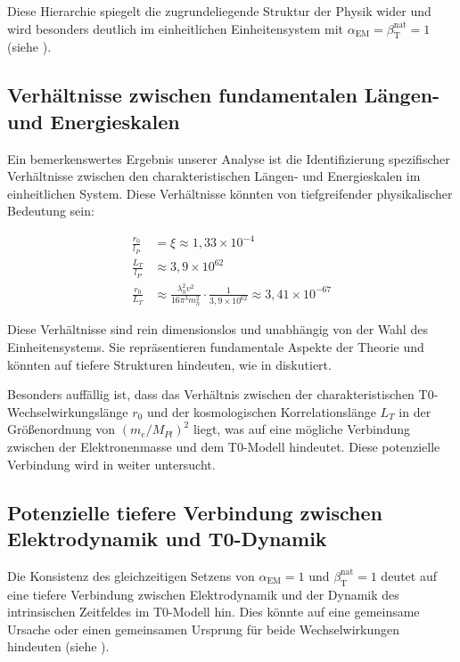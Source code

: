 \documentclass[12pt,a4paper]{article}
\newcommand{\alphaEM}{\alpha_{\text{EM}}}
\newcommand{\betaT}{\beta_{\text{T}}}
\begin{document}
	Diese Hierarchie spiegelt die zugrundeliegende Struktur der Physik wider und wird besonders deutlich im einheitlichen Einheitensystem mit \(\alphaEM = \betaT^{\text{nat}} = 1\) (siehe \cite{pascher_temp_2025}).
	
	\subsection{Verhältnisse zwischen fundamentalen Längen- und Energieskalen}
	\label{subsec:ratios}
	
	Ein bemerkenswertes Ergebnis unserer Analyse ist die Identifizierung spezifischer Verhältnisse zwischen den charakteristischen Längen- und Energieskalen im einheitlichen System. Diese Verhältnisse könnten von tiefgreifender physikalischer Bedeutung sein:
	
	\begin{tcolorbox}[colback=blue!5!white,colframe=blue!75!black,title=Fundamentale Verhältnisse im einheitlichen Einheitensystem]
		\begin{align}
			\frac{r_0}{l_P} &= \xi \approx 1,33 \times 10^{-4} \\
			\frac{L_T}{l_P} &\approx 3,9 \times 10^{62} \\
			\frac{r_0}{L_T} &\approx \frac{\lambda_h^2 v^2}{16\pi^3 m_h^2} \cdot \frac{1}{3,9 \times 10^{62}} \approx 3,41 \times 10^{-67}
		\end{align}
	\end{tcolorbox}
	
	Diese Verhältnisse sind rein dimensionslos und unabhängig von der Wahl des Einheitensystems. Sie repräsentieren fundamentale Aspekte der Theorie und könnten auf tiefere Strukturen hindeuten, wie in \cite{pascher_planck_2025} diskutiert.
	
	Besonders auffällig ist, dass das Verhältnis zwischen der charakteristischen T0-Wechselwirkungslänge \(r_0\) und der kosmologischen Korrelationslänge \(L_T\) in der Größenordnung von \((m_e/M_{Pl})^2\) liegt, was auf eine mögliche Verbindung zwischen der Elektronenmasse und dem T0-Modell hindeutet. Diese potenzielle Verbindung wird in \cite{pascher_galaxies_2025} weiter untersucht.
	
	\subsection{Potenzielle tiefere Verbindung zwischen Elektrodynamik und T0-Dynamik}
	\label{subsec:deeper_connection}
	
	Die Konsistenz des gleichzeitigen Setzens von \(\alphaEM = 1\) und \(\betaT^{\text{nat}} = 1\) deutet auf eine tiefere Verbindung zwischen Elektrodynamik und der Dynamik des intrinsischen Zeitfeldes im T0-Modell hin. Dies könnte auf eine gemeinsame Ursache oder einen gemeinsamen Ursprung für beide Wechselwirkungen hindeuten (siehe \cite{pascher_feldtheorie_2025}).
	
\end{document}
